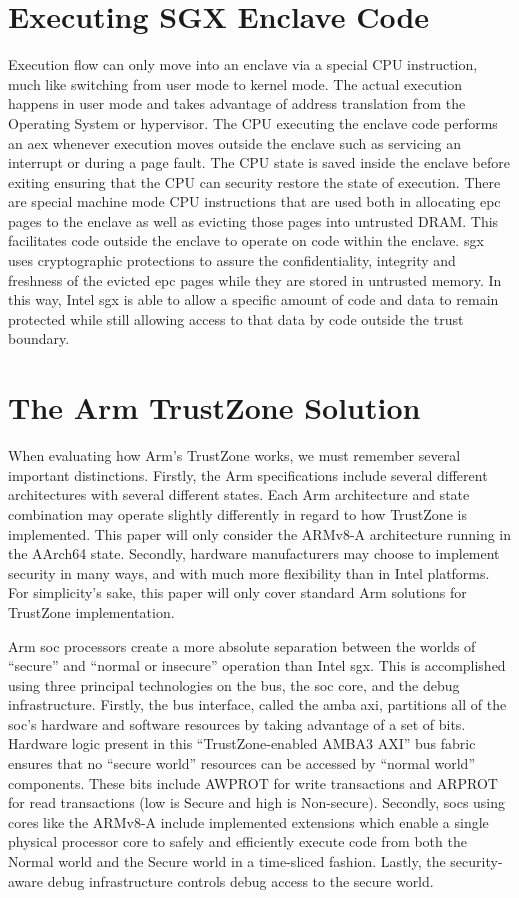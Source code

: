 \section{Executing SGX Enclave Code}
Execution flow can only move into an enclave via a special CPU instruction, much like switching from user mode to kernel mode. The actual execution happens in user mode and takes advantage of address translation from the Operating System or hypervisor. The CPU executing the enclave code performs an \gls{aex} whenever execution moves outside the enclave such as servicing an interrupt or during a page fault. The CPU state is saved inside the enclave before exiting ensuring that the CPU can security restore the state of execution. There are special machine mode CPU instructions that are used both in allocating \gls{epc} pages to the enclave as well as evicting those pages into untrusted DRAM. This facilitates code outside the enclave to operate on code within the enclave. \gls{sgx} uses cryptographic protections to assure the confidentiality, integrity and freshness of the evicted \gls{epc} pages while they are stored in untrusted memory\cite{Costan2016IntelSE}. In this way, Intel \gls{sgx} is able to allow a specific amount of code and data to remain protected while still allowing access to that data by code outside the trust boundary.
\section{The Arm TrustZone Solution}
When evaluating how Arm’s TrustZone works, we must remember several important distinctions. Firstly, the Arm specifications include several different architectures with several different states. Each Arm architecture and state combination may operate slightly differently in regard to how TrustZone is implemented. This paper will only consider the ARMv8-A architecture running in the AArch64 state. Secondly, hardware manufacturers may choose to implement security in many ways, and with much more flexibility than in Intel platforms. For simplicity’s sake, this paper will only cover standard Arm solutions for TrustZone implementation.
 
Arm \gls{soc} processors create a more absolute separation between the worlds of “secure” and “normal or insecure” operation than Intel \gls{sgx}. This is accomplished using three principal technologies on the bus, the \gls{soc} core, and the debug infrastructure. Firstly, the bus interface, called the \gls{amba} \gls{axi}, partitions all of the \gls{soc}’s hardware and software resources by taking advantage of a set of bits. Hardware logic present in this “TrustZone-enabled AMBA3 AXI” bus fabric ensures that no “secure world” resources can be accessed by “normal world” components. These bits include AWPROT for write transactions and ARPROT for read transactions (low is Secure and high is Non-secure). Secondly, \gls{soc}s using cores like the ARMv8-A include implemented extensions which enable a single physical processor core to safely and efficiently execute code from both the Normal world and the Secure world in a time-sliced fashion. Lastly, the security-aware debug infrastructure controls debug access to the secure world\cite{ArmWhitepaper}.

